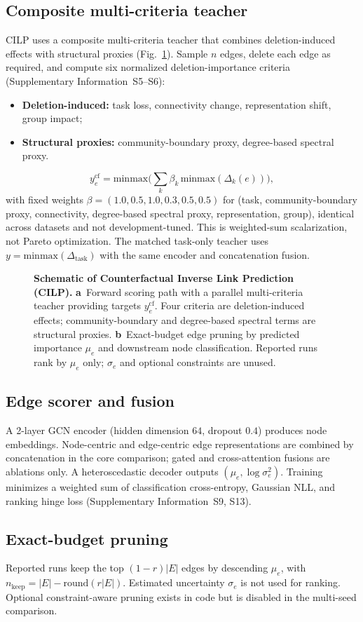 \subsection{Composite multi-criteria teacher}
CILP uses a composite multi-criteria teacher that combines deletion-induced effects with structural proxies (Fig.~\ref{fig:framework}).
Sample $n$ edges, delete each edge as required, and compute six normalized deletion-importance criteria (Supplementary Information~S5--S6):
\begin{itemize}[leftmargin=1.4em]
\item \textbf{Deletion-induced:} task loss, connectivity change, representation shift, group impact;
\item \textbf{Structural proxies:} community-boundary proxy, degree-based spectral proxy.
\end{itemize}
\[
y_e^{\mathrm{cf}}=\mathrm{minmax}\Big(\sum_k\beta_k\,\mathrm{minmax}(\Delta_k(e))\Big),
\]
with fixed weights $\beta=(1.0,0.5,1.0,0.3,0.5,0.5)$ for
(task, community-boundary proxy, connectivity, degree-based spectral proxy, representation, group),
identical across datasets and not development-tuned.
This is weighted-sum scalarization, not Pareto optimization.
The matched task-only teacher uses $y=\mathrm{minmax}(\Delta_{\mathrm{task}})$ with the same encoder and concatenation fusion.

\begin{figure}[t]
\centering
\resizebox{\textwidth}{!}{}
\caption{\textbf{Schematic of Counterfactual Inverse Link Prediction (CILP).}
\textbf{a}~Forward scoring path with a parallel multi-criteria teacher providing targets $y^{\mathrm{cf}}_e$.
Four criteria are deletion-induced effects; community-boundary and degree-based spectral terms are structural proxies.
\textbf{b}~Exact-budget edge pruning by predicted importance $\mu_e$ and downstream node classification.
Reported runs rank by $\mu_e$ only; $\sigma_e$ and optional constraints are unused.}
\label{fig:framework}
\end{figure}

\subsection{Edge scorer and fusion}
A 2-layer GCN encoder (hidden dimension $64$, dropout $0.4$) produces node embeddings.
Node-centric and edge-centric edge representations are combined by concatenation in the core comparison; gated and cross-attention fusions are ablations only.
A heteroscedastic decoder outputs $(\mu_e,\log\sigma_e^2)$.
Training minimizes a weighted sum of classification cross-entropy, Gaussian NLL, and ranking hinge loss (Supplementary Information~S9, S13).

\subsection{Exact-budget pruning}
Reported runs keep the top $(1-r)|E|$ edges by descending $\mu_e$, with
$n_{\mathrm{keep}}=|E|-\mathrm{round}(r|E|)$.
Estimated uncertainty $\sigma_e$ is not used for ranking.
Optional constraint-aware pruning exists in code but is disabled in the multi-seed comparison.
